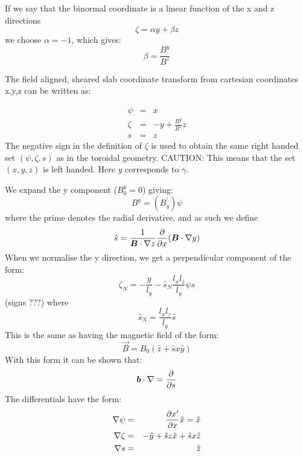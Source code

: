 If we say that the binormal coordinate is a linear function of the x and z directions
\begin{equation}
\zeta = \alpha y + \beta z
\end{equation}
we choose $\alpha=-1$, which gives:
\begin{equation}
\beta = \frac{B^y}{B^z}
\end{equation}

The field aligned, sheared slab coordinate transform from cartesian coordinates {x,y,z} can be 
written as:

\begin{eqnarray}
\psi &=& x \nonumber\\
\zeta &=& -y + \frac{B^y}{B^z} z \nonumber\\
s  &=& z
\end{eqnarray}
The negative sign in the definition of $\zeta$ is used to obtain
the same right handed set $(\psi,\zeta,s)$ as in the toroidal geometry. CAUTION: This means that the set $(x,y,z)$ is left handed.
Here $y$ corresponds to $\gamma$.

We expand the y component ($B^{y}_{0} = 0$) giving:
\begin{equation}
B^{y} = (B_{y}^{'} )\psi
\end{equation} 
where the prime denotes the radial derivative, and as such we define
\begin{equation}
\hat{s} = \frac{1}{\bm{B} \cdot \nabla z}\frac{\partial }{\partial  x} (\bm{B} \cdot \nabla y)
\end{equation}
When we normalise the y direction, we get a perpendicular component of the form:
\begin{equation}
\zeta_{N} = -\frac{y}{l_y} - \hat{s}_N\frac{l_{x}l_{z}}{l_y}\psi s
\end{equation}
\noindent
(signs ???) where
\begin{equation}
\hat{s}_{N} = \frac{l_{x}l_{z}}{l_y}\hat{s}
\end{equation}
This is the same as having the magnetic field of the form:
\begin{equation}
\vec{B} = B_{0} ( \hat{z} + \hat{s}x\hat{y})
\end{equation}
\noindent
With this form it can be shown that:
\begin{equation}
\bm{b} \cdot \nabla = \frac{\partial }{\partial s}
\end{equation}
The differentials have the form:
\begin{eqnarray}
\nabla\psi &=& \frac{\partial x'}{\partial x} \hat{x} = \hat{x} \\
\nabla\zeta &=& -\hat{y} + \hat{s}z \hat{x} + \hat{s}x\hat{z} \\
\nabla s  &=& \hat{z}
\end{eqnarray}

